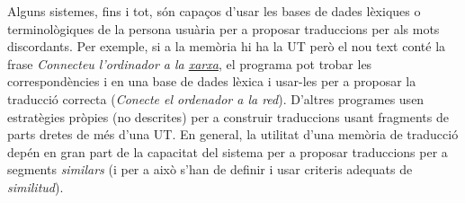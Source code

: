 Alguns sistemes, fins i tot, són capaços d'usar les bases de dades
lèxiques o terminològiques de la persona usuària per a proposar
traduccions per als mots discordants.  Per exemple, si a la memòria hi
ha la UT  però el nou text conté la frase
\emph{Connecteu l'ordinador a la \underline{xarxa}}, el programa pot
trobar les correspondències  i  en una base de dades lèxica i usar-les
per a proposar la traducció correcta (\emph{Conecte el ordenador a la
  red}).  D'altres programes usen estratègies pròpies (no descrites)
per a construir traduccions usant fragments de
parts dretes de més d'una UT.  En general, la utilitat d'una memòria
de traducció depén en gran part de la capacitat del sistema per a
proposar traduccions per a segments {\em similars} (i per a això s'han
de definir i usar criteris adequats de \emph{similitud}).

